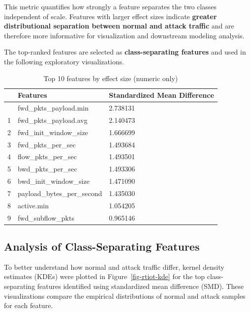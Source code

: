 \documentclass[
  letterpaper,
  DIV=11,
  numbers=noendperiod]{scrartcl}
\begin{document}
This metric quantifies how strongly a feature separates the two classes
independent of scale. Features with larger effect sizes indicate
\textbf{greater distributional separation between normal and attack
traffic} and are therefore more informative for visualization and
downstream modeling analysis.

The top-ranked features are selected as \textbf{class-separating
features} and used in the following exploratory visualizations.

\begin{longtable}[]{@{}lll@{}}

\caption{\label{tbl-rtiot-effect-sizes}Top 10 features by effect size
(numeric only)}

\tabularnewline

\toprule\noalign{}
& Features & Standardized Mean Difference \\
\midrule\noalign{}
\endhead
\bottomrule\noalign{}
\endlastfoot
0 & fwd\_pkts\_payload.min & 2.738131 \\
1 & fwd\_pkts\_payload.avg & 2.140473 \\
2 & fwd\_init\_window\_size & 1.666699 \\
3 & fwd\_pkts\_per\_sec & 1.493684 \\
4 & flow\_pkts\_per\_sec & 1.493501 \\
5 & bwd\_pkts\_per\_sec & 1.493306 \\
6 & bwd\_init\_window\_size & 1.471090 \\
7 & payload\_bytes\_per\_second & 1.435030 \\
8 & active.min & 1.054205 \\
9 & fwd\_subflow\_pkts & 0.965146 \\

\end{longtable}

\subsection{Analysis of Class-Separating
Features}\label{analysis-of-class-separating-features}

To better understand how normal and attack traffic differ, kernel
density estimates (KDEs) were plotted in Figure~\ref{fig-rtiot-kde} for
the top class-separating features identified using standardized mean
difference (SMD). These visualizations compare the empirical
distributions of normal and attack samples for each feature.
\end{document}
